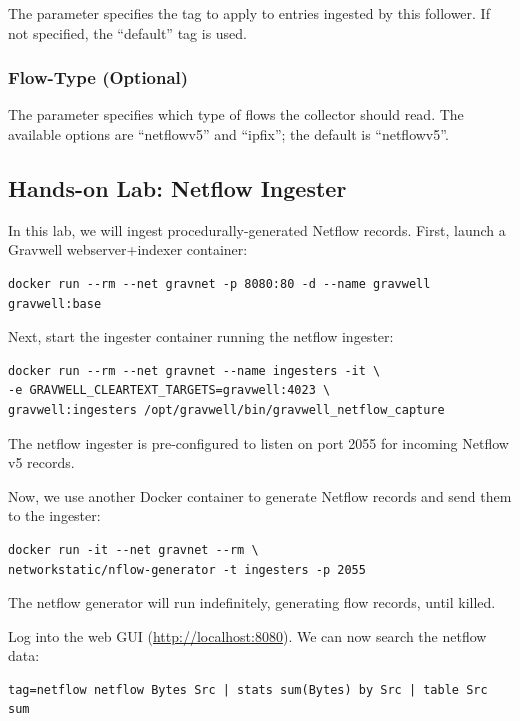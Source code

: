 The  parameter specifies the tag to apply to entries
ingested by this follower. If not specified, the ``default'' tag is
used.

\subsubsection{Flow-Type (Optional)}

The  parameter specifies which type of flows the collector
should read. The available options are ``netflowv5'' and ``ipfix''; the
default is ``netflowv5''.

\subsection{Hands-on Lab: Netflow Ingester}

In this lab, we will ingest procedurally-generated Netflow records.
First, launch a Gravwell webserver+indexer container:

\begin{Verbatim}[breaklines=true]
docker run --rm --net gravnet -p 8080:80 -d --name gravwell gravwell:base
\end{Verbatim}

Next, start the ingester container running the netflow ingester:

\begin{Verbatim}[breaklines=true]
docker run --rm --net gravnet --name ingesters -it \
-e GRAVWELL_CLEARTEXT_TARGETS=gravwell:4023 \
gravwell:ingesters /opt/gravwell/bin/gravwell_netflow_capture
\end{Verbatim}

The netflow ingester is pre-configured to listen on port 2055 for
incoming Netflow v5 records.

Now, we use another Docker container to generate Netflow records and
send them to the ingester:

\begin{Verbatim}[breaklines=true]
docker run -it --net gravnet --rm \
networkstatic/nflow-generator -t ingesters -p 2055
\end{Verbatim}

The netflow generator will run indefinitely, generating flow records,
until killed.

Log into the web GUI (\href{http://localhost:8080}{http://localhost:8080}).
We can now search the netflow data:

\begin{Verbatim}[breaklines=true]
tag=netflow netflow Bytes Src | stats sum(Bytes) by Src | table Src sum
\end{Verbatim}

